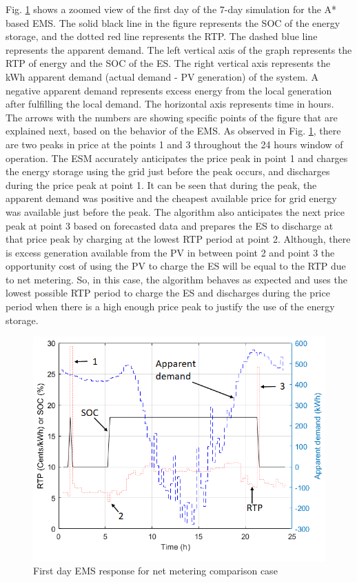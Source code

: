 Fig. \ref{fig:SBMPO_COMP_1_day} shows a zoomed view of the first day of the 7-day simulation for the A* based EMS. The solid black line in the figure represents the SOC of the energy storage, and the dotted red line represents the RTP. The dashed blue line represents the apparent demand. The left vertical axis of the graph represents the RTP of energy and the SOC of the ES. The right vertical axis represents the kWh apparent demand (actual demand - PV generation) of the system. A negative apparent demand represents excess energy from the local generation after fulfilling the local demand. The horizontal axis represents time in hours. The arrows with the numbers are showing specific points of the figure that are explained next, based on the behavior of the EMS. As observed in Fig. \ref{fig:SBMPO_COMP_1_day}, there are two peaks in price at the points 1 and 3 throughout the 24 hours window of operation. The ESM accurately anticipates the price peak in point 1 and charges the energy storage using the grid just before the peak occurs, and discharges during the price peak at point 1. It can be seen that during the peak, the apparent demand was positive and the cheapest available price for grid energy was available just before the peak. The algorithm also anticipates the next price peak at point 3 based on forecasted data and prepares the ES to discharge at that price peak by charging at the lowest RTP period at point 2. Although, there is excess generation available from the PV in between point 2 and point 3 the opportunity cost of using the PV to charge the ES will be equal to the RTP due to net metering. So, in this case, the algorithm behaves as expected and uses the lowest possible RTP period to charge the ES and discharges during the price period when there is a high enough price peak to justify the use of the energy storage.

\begin{figure}[!ht]
    \centering
    \includegraphics[width = \linewidth]{figs/A8/SBMPO_COMP_1_day.png}
    \caption{First day EMS response for net metering comparison case}
    \label{fig:SBMPO_COMP_1_day}
\end{figure}

